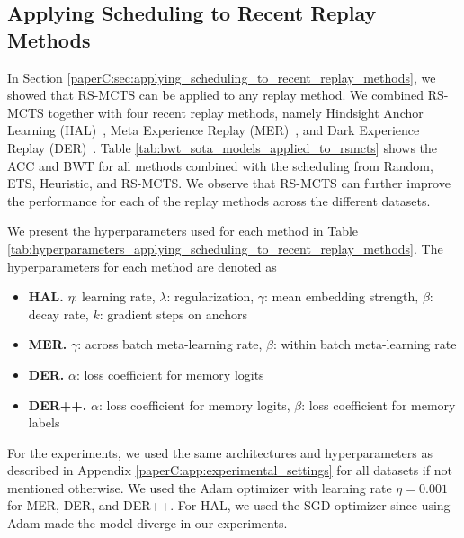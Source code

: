 \subsection{Applying Scheduling to Recent Replay Methods}
\label{paperC:app:apply_scheduling_to_recent_replay_methods}

In Section \ref{paperC:sec:applying_scheduling_to_recent_replay_methods}, we showed that RS-MCTS can be applied to any replay method. We combined RS-MCTS together with four recent replay methods, namely Hindsight Anchor Learning (HAL)~, Meta Experience Replay (MER)~, and Dark Experience Replay (DER)~. Table \ref{tab:bwt_sota_models_applied_to_rsmcts} shows the ACC and BWT for all methods combined with the scheduling from Random, ETS, Heuristic, and RS-MCTS. We observe that RS-MCTS can further improve the performance for each of the replay methods across the different datasets.  

We present the hyperparameters used for each method in Table \ref{tab:hyperparameters_applying_scheduling_to_recent_replay_methods}. The hyperparameters for each method are denoted as
\begin{itemize}[topsep=0pt, leftmargin=*, noitemsep]
	\item {\bf HAL.} $\eta$: learning rate, $\lambda$: regularization, $\gamma$: mean embedding strength, $\beta$: decay rate, $k$: gradient steps on anchors   
	\item {\bf MER.} $\gamma$: across batch meta-learning rate, $\beta$: within batch meta-learning rate 
	\item {\bf DER.} $\alpha$: loss coefficient for memory logits 
	\item {\bf DER++.} $\alpha$: loss coefficient for memory logits, $\beta$: loss coefficient for memory labels
\end{itemize}
For the experiments, we used the same architectures and hyperparameters as described in Appendix \ref{paperC:app:experimental_settings} for all datasets if not mentioned otherwise. We used the Adam optimizer with learning rate $\eta=0.001$ for MER, DER, and DER++. For HAL, we used the SGD optimizer since using Adam made the model diverge in our experiments. 

